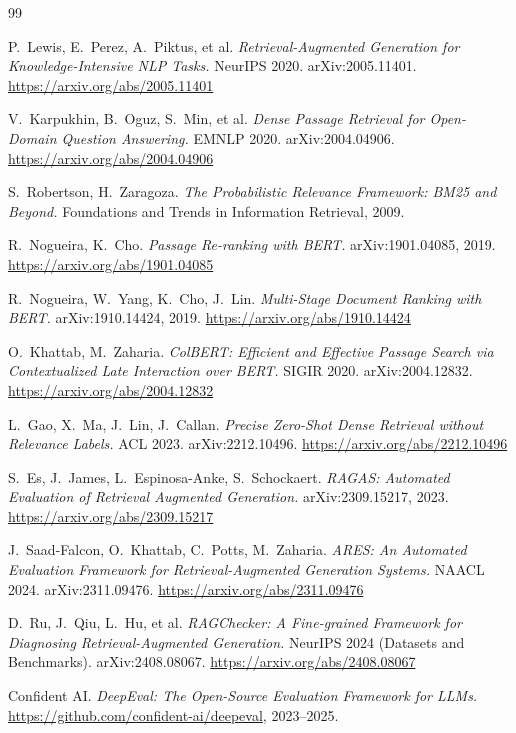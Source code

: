 \documentclass[11pt,a4paper,fontset=fandol]{ctexart}
\begin{document}
\clearpage
\begin{thebibliography}{99}

P.~Lewis, E.~Perez, A.~Piktus, et al.
\emph{Retrieval-Augmented Generation for Knowledge-Intensive NLP Tasks.}
NeurIPS 2020. arXiv:2005.11401.
\url{https://arxiv.org/abs/2005.11401}

V.~Karpukhin, B.~Oguz, S.~Min, et al.
\emph{Dense Passage Retrieval for Open-Domain Question Answering.}
EMNLP 2020. arXiv:2004.04906.
\url{https://arxiv.org/abs/2004.04906}

S.~Robertson, H.~Zaragoza.
\emph{The Probabilistic Relevance Framework: BM25 and Beyond.}
Foundations and Trends in Information Retrieval, 2009.

R.~Nogueira, K.~Cho.
\emph{Passage Re-ranking with BERT.}
arXiv:1901.04085, 2019.
\url{https://arxiv.org/abs/1901.04085}

R.~Nogueira, W.~Yang, K.~Cho, J.~Lin.
\emph{Multi-Stage Document Ranking with BERT.}
arXiv:1910.14424, 2019.
\url{https://arxiv.org/abs/1910.14424}

O.~Khattab, M.~Zaharia.
\emph{ColBERT: Efficient and Effective Passage Search via Contextualized Late Interaction over BERT.}
SIGIR 2020. arXiv:2004.12832.
\url{https://arxiv.org/abs/2004.12832}

L.~Gao, X.~Ma, J.~Lin, J.~Callan.
\emph{Precise Zero-Shot Dense Retrieval without Relevance Labels.}
ACL 2023. arXiv:2212.10496.
\url{https://arxiv.org/abs/2212.10496}

S.~Es, J.~James, L.~Espinosa-Anke, S.~Schockaert.
\emph{RAGAS: Automated Evaluation of Retrieval Augmented Generation.}
arXiv:2309.15217, 2023.
\url{https://arxiv.org/abs/2309.15217}

J.~Saad-Falcon, O.~Khattab, C.~Potts, M.~Zaharia.
\emph{ARES: An Automated Evaluation Framework for Retrieval-Augmented Generation Systems.}
NAACL 2024. arXiv:2311.09476.
\url{https://arxiv.org/abs/2311.09476}

D.~Ru, J.~Qiu, L.~Hu, et al.
\emph{RAGChecker: A Fine-grained Framework for Diagnosing Retrieval-Augmented Generation.}
NeurIPS 2024 (Datasets and Benchmarks). arXiv:2408.08067.
\url{https://arxiv.org/abs/2408.08067}

Confident AI.
\emph{DeepEval: The Open-Source Evaluation Framework for LLMs.}
\url{https://github.com/confident-ai/deepeval}, 2023--2025.


\end{thebibliography}
\end{document}
